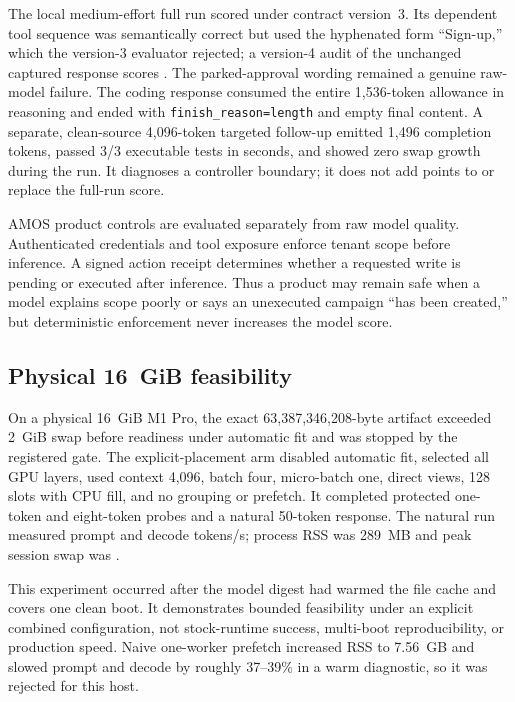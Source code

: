 \documentclass[10pt,twocolumn]{article}
\begin{document}
The local medium-effort full run scored
\CurrentLocalMediumVThreeQuality{} under contract version~3.  Its dependent
tool sequence was semantically correct but used the hyphenated form
``Sign-up,'' which the version-3 evaluator rejected; a version-4 audit of the
unchanged captured response scores \CurrentLocalMediumVFourAudit{}.  The
parked-approval wording remained a genuine raw-model failure.  The coding
response consumed the entire 1,536-token allowance in reasoning and ended
with \texttt{finish\_reason=length} and empty final content.  A separate,
clean-source 4,096-token targeted follow-up emitted 1,496 completion tokens,
passed 3/3 executable tests in \CurrentMediumCodingSeconds{} seconds, and
showed zero swap growth during the run.  It diagnoses a controller boundary;
it does not add points to or replace the full-run score.

AMOS product controls are evaluated separately from raw model quality.
Authenticated credentials and tool exposure enforce tenant scope before
inference.  A signed action receipt determines whether a requested write is
pending or executed after inference.  Thus a product may remain safe when a
model explains scope poorly or says an unexecuted campaign ``has been
created,'' but deterministic enforcement never increases the model score.

\subsection{Physical 16~GiB feasibility}

On a physical 16~GiB M1 Pro, the exact 63,387,346,208-byte artifact exceeded
2~GiB swap before readiness under automatic fit and was stopped by the
registered gate.  The explicit-placement arm disabled automatic fit, selected
all GPU layers, used context 4,096, batch four, micro-batch one, direct views,
128 slots with CPU fill, and no grouping or prefetch.  It completed protected
one-token and eight-token probes and a natural 50-token response.  The natural
run measured \CurrentSixteenPromptRate{} prompt and
\CurrentSixteenDecodeRate{} decode tokens/s; process RSS was 289~MB and peak
session swap was \CurrentSixteenPeakSwap{}.

This experiment occurred after the model digest had warmed the file cache and
covers one clean boot.  It demonstrates bounded feasibility under an explicit
combined configuration, not stock-runtime success, multi-boot
reproducibility, or production speed.  Naive one-worker prefetch increased RSS
to 7.56~GB and slowed prompt and decode by roughly 37--39\% in a warm
diagnostic, so it was rejected for this host.
\end{document}
